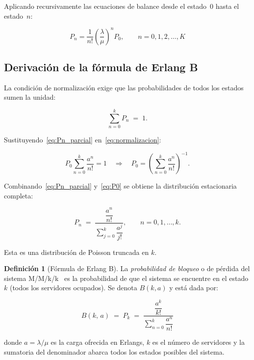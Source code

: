 \documentclass[12pt,a4paper]{article}
\theoremstyle{definition}
\newtheorem{definition}{Definición}[section]
\theoremstyle{plain}
\theoremstyle{remark}
\begin{document}
Aplicando recursivamente las ecuaciones de balance desde el estado~$0$
hasta el estado~$n$:

\begin{equation}
\boxed{P_n = \frac{1}{n!}\left(\frac{\lambda}{\mu}\right)^{\!n} P_0,
\qquad n = 0, 1, 2, \ldots, K}
\label{eq:Pn_parcial}
\end{equation}

\subsection*{Derivación de la fórmula de Erlang B}
\label{sec:erlangB}

La condición de normalización exige que las probabilidades de todos los estados sumen
la unidad:

\begin{equation}
    \sum_{n=0}^{k} P_n \;=\; 1.
    \label{eq:normalizacion}
\end{equation}

Sustituyendo~\eqref{eq:Pn_parcial} en~\eqref{eq:normalizacion}:

\begin{equation}
    P_0 \sum_{n=0}^{k} \frac{a^n}{n!} = 1
    \quad\Longrightarrow\quad
    P_0 = \left( \sum_{n=0}^{k} \frac{a^n}{n!} \right)^{-1}.
    \label{eq:P0}
\end{equation}

Combinando~\eqref{eq:Pn_parcial} y~\eqref{eq:P0} se obtiene la distribución estacionaria
completa:

\begin{equation}
    \boxed{P_n \;=\; \frac{\dfrac{a^n}{n!}}{\displaystyle\sum_{j=0}^{k} \dfrac{a^j}{j!}}},
    \qquad n = 0, 1, \ldots, k.
    \label{eq:Pn_final}
\end{equation}

Esta es una distribución de Poisson truncada en $k$.

\begin{definition}[Fórmula de Erlang B]
La \emph{probabilidad de bloqueo} o de pérdida del sistema M/M/k/k~\cite{erlang1917, kleinrock1975, gross2008} es la probabilidad de
que el sistema se encuentre en el estado $k$ (todos los servidores ocupados).
Se denota $B(k, a)$ y está dada por:

\begin{equation}
    \boxed{
        B(k,\,a) \;=\; P_k \;=\;
        \frac{\dfrac{a^k}{k!}}{\displaystyle\sum_{n=0}^{k} \dfrac{a^n}{n!}}
    }
    \label{eq:erlangB}
\end{equation}

donde $a = \lambda/\mu$ es la carga ofrecida en Erlangs, $k$ es el número de servidores y
la sumatoria del denominador abarca todos los estados posibles del sistema.
\end{definition}
\end{document}
